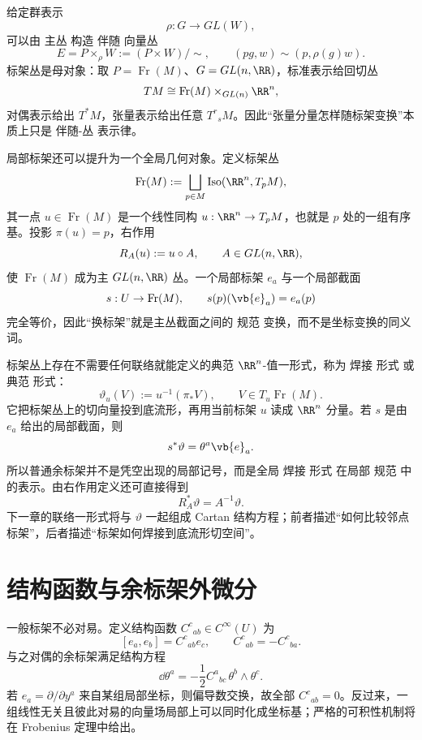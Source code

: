 给定群表示
\[
\rho:G\to GL(W),
\]
可以由 主丛 构造 伴随 向量丛
\begin{equation*}E=P\times_\rho W
:=(P\times W)/\sim,
\qquad
(pg,w)\sim(p,\rho(g)w).\end{equation*}
标架丛是母对象：取 $P=\operatorname{Fr}(M)$、$G=GL(n,\RR)$，标准表示给回切丛
\[
TM\cong\operatorname{Fr}(M)\times_{GL(n)}\RR^n,
\]
对偶表示给出 $T^*M$，张量表示给出任意 $T^r{}_sM$。因此“张量分量怎样随标架变换”本质上只是 伴随-丛 表示律。

局部标架还可以提升为一个全局几何对象。定义标架丛
\[
\operatorname{Fr}(M):=\bigsqcup_{p\in M}
\operatorname{Iso}(\RR^n,T_pM),
\]
其一点 $u\in\operatorname{Fr}(M)$ 是一个线性同构 $u:\RR^n\to T_pM$，也就是 $p$ 处的一组有序基。投影 $\pi(u)=p$，右作用
\[
R_A(u):=u\circ A,
\qquad A\in GL(n,\RR),
\]
使 $\operatorname{Fr}(M)$ 成为主 $GL(n,\RR)$ 丛。一个局部标架 $e_a$ 与一个局部截面
\[
s:U\to\operatorname{Fr}(M),
\qquad
s(p)(\vb{e}_a)=e_a(p)
\]
完全等价，因此“换标架”就是主丛截面之间的 规范 变换，而不是坐标变换的同义词。

标架丛上存在不需要任何联络就能定义的典范 $\RR^n$-值一形式，称为 焊接 形式 或 典范 形式：
\begin{equation*}\vartheta_u(V)
:=u^{-1}(\pi_*V),
\qquad
V\in T_u\operatorname{Fr}(M).\end{equation*}
它把标架丛上的切向量投到底流形，再用当前标架 $u$ 读成 $\RR^n$ 分量。若 $s$ 是由 $e_a$ 给出的局部截面，则
\begin{equation*}s^*\vartheta
 =\theta^a\vb{e}_a.\end{equation*}
所以普通余标架并不是凭空出现的局部记号，而是全局 焊接 形式 在局部 规范 中的表示。由右作用定义还可直接得到
\begin{equation*}R_A^*\vartheta=A^{-1}\vartheta.\end{equation*}
下一章的联络一形式将与 $\vartheta$ 一起组成 Cartan 结构方程；前者描述“如何比较邻点标架”，后者描述“标架如何焊接到底流形切空间”。

\section{结构函数与余标架外微分}
一般标架不必对易。定义结构函数 $C^c{}_{ab}\in C^\infty(U)$ 为
\begin{equation}\label{eq:math-dg-synthesis-anholonomy}
[e_a,e_b]=C^c{}_{ab}e_c,
\qquad
C^c{}_{ab}=-C^c{}_{ba}.
\end{equation}
与之对偶的余标架满足结构方程
\begin{equation}\label{eq:math-dg-frame-structure-equation}
{\dd\theta^a=-\frac12 C^a{}_{bc}\,\theta^b\wedge\theta^c.}
\end{equation}
若 $e_a=\partial/\partial y^a$ 来自某组局部坐标，则偏导数交换，故全部 $C^c{}_{ab}=0$。反过来，一组线性无关且彼此对易的向量场局部上可以同时化成坐标基；严格的可积性机制将在 Frobenius 定理中给出。


